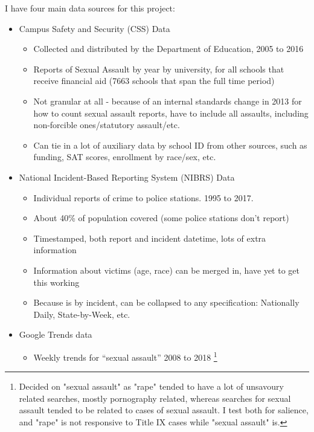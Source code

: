 \documentclass[AER,draftmode]{AEA}
\begin{document}
I have four main data sources for this project: 
\begin{itemize}
    \item Campus Safety and Security (CSS) Data
    \begin{itemize}
        \item Collected and distributed by the Department of Education, 2005 to 2016
        \item Reports of Sexual Assault by year by university, for all schools that receive financial aid (7663 schools that span the full time period)
        \item Not granular at all - because of an internal standards change in 2013 for how to count sexual assault reports, have to include all assaults, including non-forcible ones/statutory assault/etc.
        \item Can tie in a lot of auxiliary data by school ID from other sources, such as funding, SAT scores, enrollment by race/sex, etc.
    \end{itemize}
    \item National Incident-Based Reporting System (NIBRS) Data
    \begin{itemize}
        \item Individual reports of crime to police stations. 1995 to 2017.
        \item About 40\% of population covered (some police stations don’t report)
        \item Timestamped, both report and incident datetime, lots of extra information
        \item Information about victims (age, race) can be merged in, have yet to get this working
        \item Because is by incident, can be collapsed to any specification: Nationally Daily, State-by-Week, etc. 
    \end{itemize}
    \item Google Trends data
    \begin{itemize}
        \item Weekly trends for “sexual assault” 2008 to 2018 \footnote{Decided on "sexual assault" as "rape" tended to have a lot of unsavoury related searches, mostly pornography related, whereas searches for sexual assault tended to be related to cases of sexual assault. I test both for salience, and "rape" is not responsive to Title IX cases while "sexual assault" is.} 

\end{itemize}
\end{itemize}
\end{document}
